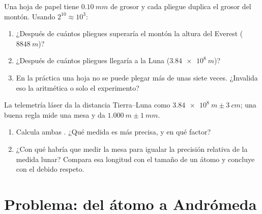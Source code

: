 \begin{exercise}[$\star\star\star$]\label{exo:g10:orders-of-magnitude:14}
Una hoja de papel tiene $\qty{0.10}{mm}$ de grosor y cada pliegue
duplica el grosor del montón. Usando $2^{10} \approx 10^{3}$:
\begin{enumerate}
  \item ¿Después de cuántos pliegues superaría el montón la altura del
        Everest ($\qty{8848}{m}$)?
  \item ¿Después de cuántos pliegues llegaría a la Luna
        ($\qty{3.84e8}{m}$)?
  \item En la práctica una hoja no se puede plegar más de unas siete
        veces. ¿Invalida eso la aritmética o solo el experimento?
\end{enumerate}
\end{exercise}

\begin{exercise}[$\star\star\star$]\label{exo:g10:orders-of-magnitude:15}
La telemetría láser da la distancia Tierra--Luna como
$\qty{3.84e8}{m} \pm \qty{3}{cm}$; una buena regla mide una mesa y da
$\qty{1.000}{m} \pm \qty{1}{mm}$.
\begin{enumerate}
  \item Calcula ambas . ¿Qué medida es más
        precisa, y en qué factor?
  \item ¿Con qué  habría que medir la mesa para
        igualar la precisión relativa de la medida lunar? Compara esa
        longitud con el tamaño de un átomo y concluye con el debido
        respeto.
\end{enumerate}
\end{exercise}

\section{Problema: del átomo a Andrómeda}


